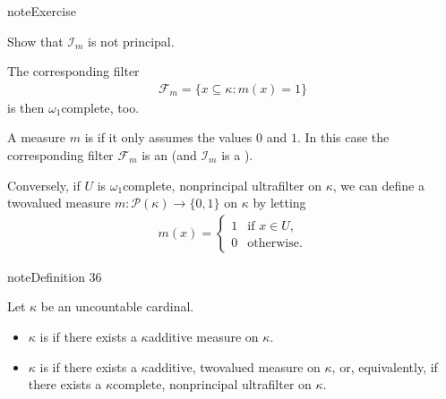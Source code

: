 \documentclass[letterpaper,10pt,english]{jupyterBook}
\begin{document}
\begin{sphinxadmonition}{note}{Exercise}

\sphinxAtStartPar
Show that \(\mathcal{I}_m\) is not principal.
\end{sphinxadmonition}

\sphinxAtStartPar
The corresponding filter
\begin{equation*}
\begin{split}
\mathcal{F}_m = \{x\subseteq \kappa \colon m(x) = 1\}
\end{split}
\end{equation*}
\sphinxAtStartPar
is then \(\omega_1\)\sphinxhyphen{}complete, too.

\sphinxAtStartPar
A measure \(m\) is  if it only assumes the values \(0\) and \(1\). In this case the corresponding filter \(\mathcal{F}_m\) is an  (and \(\mathcal{I}_m\) is a ).

\sphinxAtStartPar
Conversely, if \(U\) is \(\omega_1\)\sphinxhyphen{}complete, non\sphinxhyphen{}principal ultrafilter on \(\kappa\), we can define a two\sphinxhyphen{}valued measure \(m: \mathcal{P}(\kappa) \to \{0,1\}\) on \(\kappa\) by letting
\begin{equation*}
\begin{split}
m(x) = 
  \begin{cases}
   1  & \text{if } x \in U, \\
   0   & \text{otherwise}.
\end{cases}
\end{split}
\end{equation*}\label{large_cardinals:def-measurable-cardinal}
\begin{sphinxadmonition}{note}{Definition 36}



\sphinxAtStartPar
Let \(\kappa\) be an uncountable cardinal.
\begin{itemize}
\item {} 
\sphinxAtStartPar
\(\kappa\) is  if there exists a \(\kappa\)\sphinxhyphen{}additive measure on \(\kappa\).

\item {} 
\sphinxAtStartPar
\(\kappa\) is  if there exists a \(\kappa\)\sphinxhyphen{}additive, two\sphinxhyphen{}valued measure on \(\kappa\), or, equivalently, if there exists a \(\kappa\)\sphinxhyphen{}complete, non\sphinxhyphen{}principal ultrafilter on \(\kappa\).

\end{itemize}
\end{sphinxadmonition}
\end{document}
